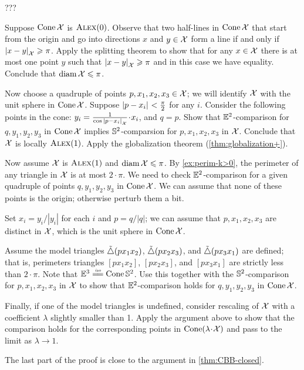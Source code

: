  ???

Suppose $\mathop{\rm Cone}\nolimits\mathcal{X}$ is $\textsc{Alex}(0)$.
Observe that two half-lines in $\mathop{\rm Cone}\nolimits\mathcal{X}$ that start from the origin and go into directions $x$ and $y\in\mathcal{X}$ form a line if and only if $|{x}-{y}|_{\mathcal{X}}^{{}}\geqslant \pi$.
Apply the splitting theorem to show that for any $x\in \mathcal{X}$ there is at most one point $y$ such that $|{x}-{y}|_{\mathcal{X}}^{{}}\geqslant \pi$ and in this case we have equality.
Conclude that $\operatorname{\rm diam}\nolimits \mathcal{X}\leqslant \pi$.

Now choose a quadruple of points $p,x_1,x_2,x_3\in \mathcal{X}$;
we will identify $\mathcal{X}$ with the unit sphere in $\mathop{\rm Cone}\nolimits\mathcal{X}$.
Suppose $|{p}-{x_i}|_{}^{{}}<\tfrac\pi2$ for any $i$.
Consider the following points in the cone: $y_i=\tfrac1{\cos \dist{p}{x_i}{\spc{X}}}\cdot x_i$, and $q=p$.
Show that $\mathbb{E}^2$-comparison for $q,y_1,y_2,y_3$ in $\mathop{\rm Cone}\nolimits\mathcal{X}$ implies $\mathbb{S}^2$-comparsion for $p,x_1,x_2,x_3$ in $\mathcal{X}$.
Conclude that $\mathcal{X}$ is locally $\textsc{Alex}(1)$. 
Apply the globalization theorem (\ref{thm:globalization+}).

Now assume $\mathcal{X}$ is $\textsc{Alex}(1)$ and $\operatorname{\rm diam}\nolimits\mathcal{X}\leqslant \pi$.
By \ref{ex:perim-k>0}, the perimeter of any triangle in $\mathcal{X}$ is at most $2\cdot\pi$.
We need to check $\mathbb{E}^2$-comparison for a given quadruple of points $q,y_1,y_2,y_3$ in $\mathop{\rm Cone}\nolimits\mathcal{X}$.
We can assume that none of these points is the origin; otherwise perturb them a bit.

Set $x_i=y_i/|y_i|$ for each $i$ and $p=q/|q|$; we can assume that $p,x_1,x_2,x_3$ are distinct in $\mathcal{X}$, which is the unit sphere in $\mathop{\rm Cone}\nolimits\mathcal{X}$.

Assume the model triangles $\tilde\triangle(px_1x_2)$, $\tilde\triangle(px_2x_3)$, and $\tilde\triangle(px_3x_1)$ are defined;
that is, perimeters triangles $[px_1x_2]$, $[px_2x_3]$, and $[px_3x_1]$ are strictly less than $2\cdot\pi$. 
Note that $\EE^3\iso\Cone\SSS^2$.
Use this together with the $\mathbb{S}^2$-comparison for $p,x_1,x_2,x_3$ in $\mathcal{X}$ to show that $\mathbb{E}^2$-comparison holds for $q,y_1,y_2,y_3$ in $\mathop{\rm Cone}\nolimits\mathcal{X}$.

Finally, if one of the model triangles is undefined, consider rescaling of $\mathcal{X}$ with a coefficient $\lambda$ slightly smaller than 1.
Apply the argument above to show that the comparison holds for the corresponding points in $\Cone(\lambda\cdot\spc{X})$ and pass to the limit as $\lambda\to 1$.

The last part of the proof is close to the argument in \ref{thm:CBB-closed}.

